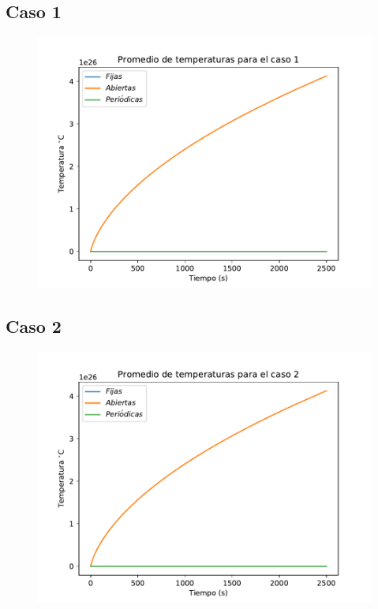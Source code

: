 \documentclass[12pt,letterpaper]{article}
\begin{document}
\subsection*{Caso 1}

\begin{figure}[H]
\includegraphics{prom1.pdf}
\centering
\end{figure}

\subsection*{Caso 2}

\begin{figure}[H]
\includegraphics{prom2.pdf}
\centering
\end{figure}


\vspace{0.3cm}
\end{document}
